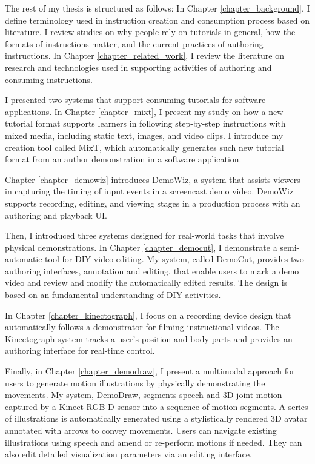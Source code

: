 The rest of my thesis is structured as follows:
%
In Chapter \ref{chapter_background}, I define terminology used in instruction creation and consumption process based on literature. I review studies on why people rely on tutorials in general, how the formats of instructions matter, and the current practices of authoring instructions.
%
In Chapter \ref{chapter_related_work}, I review the literature on research and technologies used in supporting activities of authoring and consuming instructions.

I presented two systems that support consuming tutorials for software applications.
In Chapter \ref{chapter_mixt}, I present my study on how a new tutorial format supports learners in following step-by-step instructions with mixed media, including static text, images, and video clips. I introduce my creation tool called MixT, which automatically generates such new tutorial format from an author demonstration in a software application.

Chapter \ref{chapter_demowiz} introduces DemoWiz, a system that assists viewers in capturing the timing of input events in a screencast demo video. DemoWiz supports recording, editing, and viewing stages in a production process with an authoring and playback UI.

Then, I introduced three systems designed for real-world tasks that involve physical demonstrations.
In Chapter \ref{chapter_democut}, I demonstrate a semi-automatic tool for DIY video editing. My system, called DemoCut, provides two authoring interfaces, annotation and editing, that enable users to mark a demo video and review and modify the automatically edited results. The design is based on an fundamental understanding of DIY activities.

In Chapter \ref{chapter_kinectograph}, I focus on a recording device design that automatically follows a demonstrator for filming instructional videos. The Kinectograph system tracks a user's position and body parts and provides an authoring interface for real-time control.

Finally, in Chapter \ref{chapter_demodraw}, I present a multimodal approach for users to generate motion illustrations by physically demonstrating the movements. My system, DemoDraw, segments speech and 3D joint motion captured by a Kinect RGB-D sensor into a sequence of motion segments. A series of illustrations is automatically generated using a stylistically rendered 3D avatar annotated with arrows to convey movements. Users can navigate existing illustrations using speech and amend or re-perform motions if needed. They can also edit detailed visualization parameters via an editing interface.

